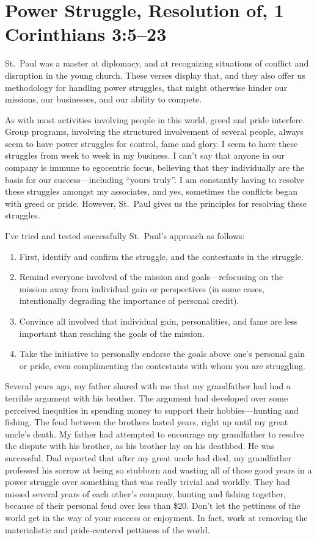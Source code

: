 \documentclass[12pt]{memoir}
\begin{document}
\section{Power Struggle, Resolution of, 1 Corinthians 3:5--23}

St.~Paul was a master at diplomacy, and at recognizing situations
of conflict and disruption in the young church. These verses display
that, and they also offer us methodology for handling power struggles,
that might otherwise hinder our missions, our businesses, and our
ability to compete.

As with most activities involving people in this world, greed and
pride interfere. Group programs, involving the structured involvement
of several people, always seem to have power struggles for control,
fame and glory. I seem to have these struggles from week to week in
my business. I can't say that anyone in our company is immune to egocentric
focus, believing that they individually are the basis for our success---including
``yours truly''. I am constantly having to resolve these struggles
amongst my associates, and yes, sometimes the conflicts began with
greed or pride.
However, St.~Paul gives us the principles for resolving
these struggles. 

I've tried and tested successfully St.~Paul's approach as follows:
\begin{enumerate}
\item First, identify and confirm the struggle, and the contestants in the
struggle. 
\item Remind everyone involved of the mission and goals---refocusing on
the mission away from individual gain or perspectives (in some cases,
intentionally degrading the importance of personal credit). 
\item Convince all involved that individual gain, personalities, and fame
are less important than reaching the goals of the mission. 
\item Take the initiative to personally endorse the goals above one's personal
gain or pride, even complimenting the contestants with whom you are
struggling. 
\end{enumerate}
Several years ago, my father shared with me that my grandfather had
had a terrible argument with his brother. The argument had developed
over some perceived inequities in spending money to support their
hobbies---hunting and fishing. The feud between the brothers lasted
years, right up until my great uncle's death. My father had attempted
to encourage my grandfather to resolve the dispute with his brother,
as his brother lay on his deathbed. He was successful. Dad reported
that after my great uncle had died, my grandfather professed his sorrow
at being so stubborn and wasting all of those good years in a power
struggle over something that was really trivial and worldly. They
had missed several years of each other's company, hunting and fishing
together, because of their personal feud over less than \$20. Don't
let the pettiness of the world get in the way of your success or enjoyment.
In fact, work at removing the materialistic and pride-centered pettiness
of the world.
\end{document}

